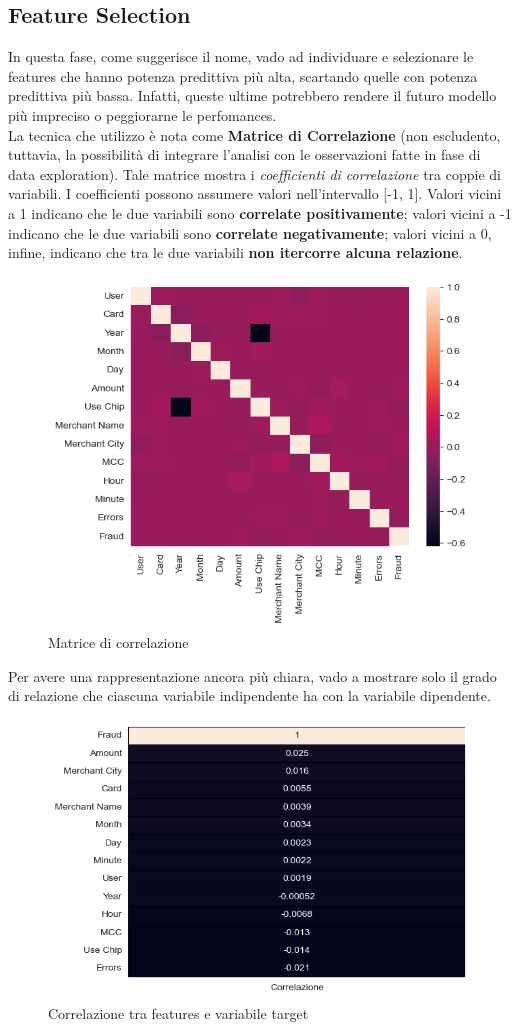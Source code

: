 \documentclass[]{article}
\begin{document}
    \subsection{Feature Selection}
        In questa fase, come suggerisce il nome, vado ad individuare e selezionare le features che hanno potenza predittiva più alta, scartando quelle con potenza predittiva più bassa. Infatti, queste ultime potrebbero rendere il futuro modello più impreciso o peggiorarne le perfomances.\\
        La tecnica che utilizzo è nota come \textbf{Matrice di Correlazione} (non escludento, tuttavia, la possibilità di integrare l'analisi con le osservazioni fatte in fase di data exploration). Tale matrice mostra i \textit{coefficienti di correlazione} tra coppie di variabili. I coefficienti possono assumere valori nell'intervallo [-1, 1]. Valori vicini a 1 indicano che le due variabili sono \textbf{correlate positivamente}; valori vicini a -1 indicano che le due variabili sono \textbf{correlate negativamente}; valori vicini a 0, infine, indicano che tra le due variabili \textbf{non itercorre alcuna relazione}.
        \begin{figure}[H]
            \centering
            \includegraphics[width=.6\textwidth]{img/CorrelationMatrix.png}
            \caption[short]{Matrice di correlazione}
        \end{figure}
        Per avere una rappresentazione ancora più chiara, vado a mostrare solo il grado di relazione che ciascuna variabile indipendente ha con la variabile dipendente.
        \begin{figure}[H]
            \centering
            \includegraphics[width=.5\textwidth]{img/Correlation.png}
            \caption[short]{Correlazione tra features e variabile target}
        \end{figure}
\end{document}
